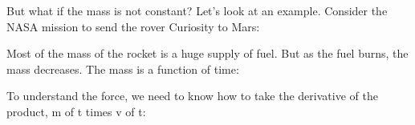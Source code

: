 \documentclass[pdftex, brazil, 12pt, twoside]{article}
\begin{document}
But what if the mass is not constant?
Let's look at an example.
Consider the NASA mission to send the rover Curiosity
to Mars:

\begin{figure}[H]
  \begin{center}
  \end{center}
\end{figure}

Most of the mass of the rocket is a huge supply of fuel.
But as the fuel burns, the mass decreases.
The mass is a function of time:

\begin{figure}[H]
  \begin{center}
  \end{center}
\end{figure}

To understand the force, we need to know
how to take the derivative of the product, m
of t times v of t:

\begin{figure}[H]
  \begin{center}
  \end{center}
\end{figure}
\end{document}
